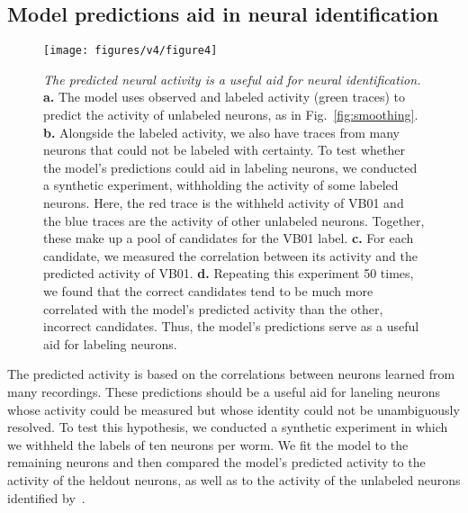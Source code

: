 \documentclass[11pt]{article}
\begin{document}
\subsection*{Model predictions aid in neural identification}

\begin{figure}[t!]
\centering
\texttt{[image: figures/v4/figure4]} 
\caption{ \textit{The predicted neural activity is a useful aid for
    neural identification.}  \textbf{a.} The model uses observed and
  labeled activity (green traces) to predict the activity of unlabeled
  neurons, as in Fig.~\ref{fig:smoothing}. \textbf{b.} Alongside the
  labeled activity, we also have traces from many neurons that could
  not be labeled with certainty. To test whether the model's
  predictions could aid in labeling neurons, we conducted a synthetic
  experiment, withholding the activity of some labeled neurons. Here,
  the red trace is the withheld activity of VB01 and the blue traces
  are the activity of other unlabeled neurons.  Together, these make
  up a pool of candidates for the VB01 label.  \textbf{c.} For each
  candidate, we measured the correlation between its activity and the
  predicted activity of VB01.  \textbf{d.} Repeating this experiment
  50 times, we found that the correct candidates tend to be much more
  correlated with the model's predicted activity than the other,
  incorrect candidates.  Thus, the model's predictions serve as a
  useful aid for labeling neurons.  }
\label{fig:id}
\end{figure}

The predicted activity is based on the correlations between neurons
learned from many recordings.  These predictions should be a useful
aid for laneling neurons whose activity could be measured but whose
identity could not be unambiguously resolved.  To test this
hypothesis, we conducted a synthetic experiment in which we withheld
the labels of ten neurons per worm.  We fit the model to the remaining
neurons and then compared the model's predicted activity to the
activity of the heldout neurons, as well as to the activity of the
unlabeled neurons identified by~\citet{kato2015global}.
\end{document}
